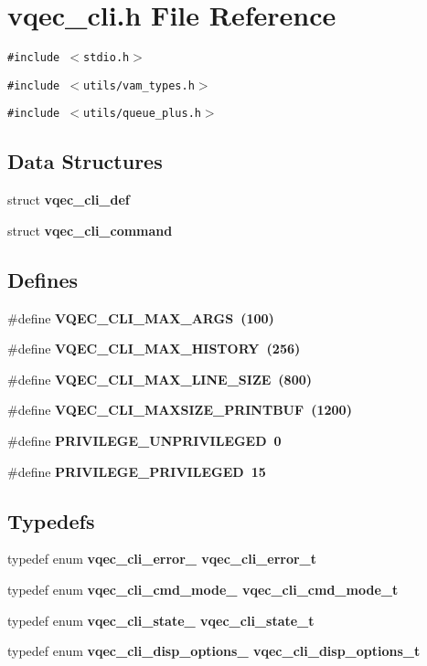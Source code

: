 \section{vqec\_\-cli.h File Reference}
\label{vqec__cli_8h}
{\tt \#include $<$stdio.h$>$}\par
{\tt \#include $<$utils/vam\_\-types.h$>$}\par
{\tt \#include $<$utils/queue\_\-plus.h$>$}\par
\subsection*{Data Structures}
\begin{CompactItemize}
\item 
struct \bf{vqec\_\-cli\_\-def}
\item 
struct \bf{vqec\_\-cli\_\-command}
\end{CompactItemize}
\subsection*{Defines}
\begin{CompactItemize}
\item 
\#define \bf{VQEC\_\-CLI\_\-MAX\_\-ARGS}~(100)
\item 
\#define \bf{VQEC\_\-CLI\_\-MAX\_\-HISTORY}~(256)
\item 
\#define \bf{VQEC\_\-CLI\_\-MAX\_\-LINE\_\-SIZE}~(800)
\item 
\#define \bf{VQEC\_\-CLI\_\-MAXSIZE\_\-PRINTBUF}~(1200)
\item 
\#define \bf{PRIVILEGE\_\-UNPRIVILEGED}~0
\item 
\#define \bf{PRIVILEGE\_\-PRIVILEGED}~15
\end{CompactItemize}
\subsection*{Typedefs}
\begin{CompactItemize}
\item 
typedef enum \bf{vqec\_\-cli\_\-error\_\-} \bf{vqec\_\-cli\_\-error\_\-t}
\item 
typedef enum \bf{vqec\_\-cli\_\-cmd\_\-mode\_\-} \bf{vqec\_\-cli\_\-cmd\_\-mode\_\-t}
\item 
typedef enum \bf{vqec\_\-cli\_\-state\_\-} \bf{vqec\_\-cli\_\-state\_\-t}
\item 
typedef enum \bf{vqec\_\-cli\_\-disp\_\-options\_\-} \bf{vqec\_\-cli\_\-disp\_\-options\_\-t}
\end{CompactItemize}
